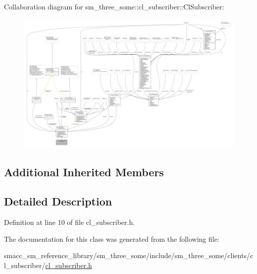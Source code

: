 Collaboration diagram for sm\+\_\+three\+\_\+some\+:\+:cl\+\_\+subscriber\+:\+:Cl\+Subscriber\+:\nopagebreak
\begin{figure}[H]
\begin{center}
\leavevmode
\includegraphics[width=350pt]{classsm__three__some_1_1cl__subscriber_1_1ClSubscriber__coll__graph}
\end{center}
\end{figure}
\subsection*{Additional Inherited Members}


\subsection{Detailed Description}


Definition at line 10 of file cl\+\_\+subscriber.\+h.



The documentation for this class was generated from the following file\+:\begin{DoxyCompactItemize}
\item 
smacc\+\_\+sm\+\_\+reference\+\_\+library/sm\+\_\+three\+\_\+some/include/sm\+\_\+three\+\_\+some/clients/cl\+\_\+subscriber/\hyperlink{cl__subscriber_8h}{cl\+\_\+subscriber.\+h}\end{DoxyCompactItemize}
